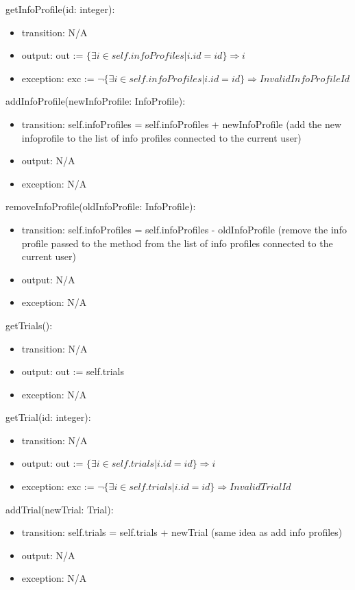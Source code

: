 \documentclass[12pt, titlepage]{article}
\begin{document}
\noindent getInfoProfile(id: integer):
\begin{itemize}
\item transition: N/A
\item output: out := $\{\exists i \in self.infoProfiles | i.id = id\} \Rightarrow i$
\item exception: exc := $\neg\{\exists i \in self.infoProfiles | i.id = id\} \Rightarrow InvalidInfoProfileId$
\end{itemize}

\noindent addInfoProfile(newInfoProfile: InfoProfile):
\begin{itemize}
\item transition: self.infoProfiles = self.infoProfiles + newInfoProfile (add the new infoprofile to the list of info profiles connected to the 
current user)
\item output: N/A
\item exception: N/A
\end{itemize}

\noindent removeInfoProfile(oldInfoProfile: InfoProfile):
\begin{itemize}
\item transition: self.infoProfiles = self.infoProfiles - oldInfoProfile (remove the info profile passed to the method from the list of info 
profiles connected to the current user)
\item output: N/A
\item exception: N/A
\end{itemize}

\noindent getTrials():
\begin{itemize}
\item transition: N/A
\item output: out := self.trials
\item exception: N/A
\end{itemize}

\noindent getTrial(id: integer):
\begin{itemize}
\item transition: N/A
\item output: out := $\{\exists i \in self.trials | i.id = id\} \Rightarrow i$
\item exception: exc := $\neg\{\exists i \in self.trials | i.id = id\} \Rightarrow InvalidTrialId$
\end{itemize}

\noindent addTrial(newTrial: Trial):
\begin{itemize}
\item transition: self.trials = self.trials + newTrial (same idea as add info profiles)
\item output: N/A
\item exception: N/A
\end{itemize}
\end{document}
